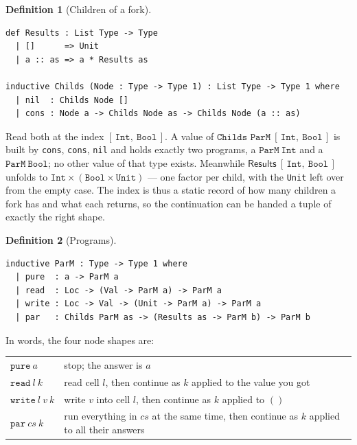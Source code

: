 \documentclass[11pt,a4paper]{article}
\theoremstyle{definition}
\newtheorem{definition}{Definition}
\theoremstyle{plain}
\theoremstyle{remark}
\newcommand{\PM}{\texttt{ParM}}
\begin{document}
\begin{definition}[Children of a fork]\label{def:childs}
\begin{lstlisting}
def Results : List Type -> Type
  | []      => Unit
  | a :: as => a * Results as

inductive Childs (Node : Type -> Type 1) : List Type -> Type 1 where
  | nil  : Childs Node []
  | cons : Node a -> Childs Node as -> Childs Node (a :: as)
\end{lstlisting}
\end{definition}

Read both at the index $[\,\texttt{Int},\ \texttt{Bool}\,]$. A value of
$\texttt{Childs ParM}\ [\,\texttt{Int},\ \texttt{Bool}\,]$ is built by \texttt{cons},
\texttt{cons}, \texttt{nil} and holds exactly two programs, a $\PM\ \texttt{Int}$ and a
$\PM\ \texttt{Bool}$; no other value of that type exists. Meanwhile
$\mathsf{Results}\ [\,\texttt{Int},\ \texttt{Bool}\,]$ unfolds to
$\texttt{Int} \times (\texttt{Bool} \times \texttt{Unit})$ --- one factor per child, with
the \texttt{Unit} left over from the empty case. The index is thus a static record of how
many children a fork has and what each returns, so the continuation can be handed a tuple
of exactly the right shape.

\begin{definition}[Programs]\label{def:parm}
\begin{lstlisting}
inductive ParM : Type -> Type 1 where
  | pure  : a -> ParM a
  | read  : Loc -> (Val -> ParM a) -> ParM a
  | write : Loc -> Val -> (Unit -> ParM a) -> ParM a
  | par   : Childs ParM as -> (Results as -> ParM b) -> ParM b
\end{lstlisting}
\end{definition}

In words, the four node shapes are:
\begin{center}\small
\begin{tabular}{@{}ll@{}}
\toprule
$\texttt{pure}\ a$         & stop; the answer is $a$ \\
$\texttt{read}\ l\ k$      & read cell $l$, then continue as $k$ applied to the value you got \\
$\texttt{write}\ l\ v\ k$  & write $v$ into cell $l$, then continue as $k$ applied to $()$ \\
$\texttt{par}\ cs\ k$      & run everything in $cs$ at the same time, then continue as $k$ applied to all their answers \\
\bottomrule
\end{tabular}
\end{center}
\end{document}

